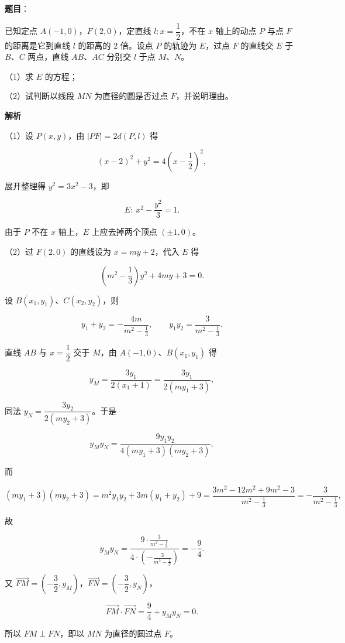 \begin{answer}

\textbf{题目}：

已知定点 $A(-1,0)$，$F(2,0)$，定直线 $l:x=\dfrac{1}{2}$，不在 $x$ 轴上的动点 $P$ 与点 $F$ 的距离是它到直线 $l$ 的距离的 $2$ 倍。设点 $P$ 的轨迹为 $E$，过点 $F$ 的直线交 $E$ 于 $B$、$C$ 两点，直线 $AB$、$AC$ 分别交 $l$ 于点 $M$、$N$。

（1）求 $E$ 的方程；

（2）试判断以线段 $MN$ 为直径的圆是否过点 $F$，并说明理由。

\textbf{解析}

（1）设 $P(x,y)$，由 $|PF|=2d(P,l)$ 得

\nopagebreak[4]
\[(x-2)^2+y^2=4\left(x-\frac12\right)^2,\]

展开整理得 $y^2=3x^2-3$，即

\nopagebreak[4]
\[E:\ x^2-\frac{y^2}3=1.\]

由于 $P$ 不在 $x$ 轴上，$E$ 上应去掉两个顶点 $(\pm1,0)$。

（2）过 $F(2,0)$ 的直线设为 $x=my+2$，代入 $E$ 得

\nopagebreak[4]
\[\left(m^2-\frac13\right)y^2+4my+3=0.\]

设 $B(x_1,y_1)$、$C(x_2,y_2)$，则

\nopagebreak[4]
\[y_1+y_2=-\frac{4m}{m^2-\frac13},\qquad y_1y_2=\frac{3}{m^2-\frac13}.\]

直线 $AB$ 与 $x=\dfrac12$ 交于 $M$，由 $A(-1,0)$、$B(x_1,y_1)$ 得

\nopagebreak[4]
\[y_M=\frac{3y_1}{2\left(x_1+1\right)}=\frac{3y_1}{2\left(my_1+3\right)},\]

同法 $y_N=\dfrac{3y_2}{2\left(my_2+3\right)}$。于是

\nopagebreak[4]
\[y_My_N=\frac{9y_1y_2}{4\left(my_1+3\right)\left(my_2+3\right)},\]

而

\nopagebreak[4]
\[\left(my_1+3\right)\left(my_2+3\right)=m^2y_1y_2+3m\left(y_1+y_2\right)+9=\frac{3m^2-12m^2+9m^2-3}{m^2-\frac13}=-\frac{3}{m^2-\frac13},\]

故

\nopagebreak[4]
\[y_My_N=\frac{9\cdot\frac{3}{m^2-\frac13}}{4\cdot\left(-\frac{3}{m^2-\frac13}\right)}=-\frac94.\]

又 $\overrightarrow{FM}=\left(-\dfrac32,y_M\right)$，$\overrightarrow{FN}=\left(-\dfrac32,y_N\right)$，

\nopagebreak[4]
\[\overrightarrow{FM}\cdot\overrightarrow{FN}=\frac94+y_My_N=0.\]

所以 $FM\perp FN$，即以 $MN$ 为直径的圆过点 $F$。


\end{answer}
